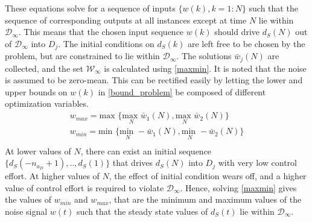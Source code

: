 \documentclass[letterpaper, 10 pt, conference]{ieeeconf}  %
\begin{document}
\begin{enumerate}
	These equations solve for a sequence of inputs $\{w(k), k={1:N}\}$ such that the sequence of corresponding outputs at all instances except at time $N$ lie within $\mathcal{D}_{\infty}$. This means that the chosen input sequence $w(k)$ should drive $d_S(N)$ out of $\mathcal{D}_{\infty}$ into $D_j$. The initial conditions on $d_S(k)$ are left free to be chosen by the problem, but are constrained to lie within $\mathcal{D}_{\infty}$.
	The solutions $\bar{w}_j(N)$ are collected, and the set $\mathcal{W}_{\infty}$ is calculated using \eqref{maxmin}. It is noted that the noise is assumed to be zero-mean. This can be rectified easily by letting the lower and upper bounds on $w(k)$ in \eqref{bound_problem} be composed of different optimization variables.
	\begin{equation}
		\begin{matrix}
		w_{max} = {\text{max }}\{\underset{N}{\text{max }} \bar{w}_1(N),\underset{N}{\text{max }}\bar{w}_2(N)\} \\
		w_{min} = {\text{min }}\{\underset{N}{\text{min }}-\bar{w}_1(N),\underset{N}{\text{min }}-\bar{w}_2(N)\} \\
		\end{matrix}
		\label{maxmin}
	\end{equation}
	At lower values of $N$, there can exist an initial sequence $\{d_S(-n_{a_D}+1),..,d_S(1)\}$ that drives $d_S(N)$ into $D_j$ with very low control effort. At higher values of $N$, the effect of initial condition wears off, and a higher value of control effort is required to violate $\mathcal{D}_{\infty}$. Hence, solving \eqref{maxmin} gives the values of $w_{min}$ and $w_{max}$, that are the minimum and maximum values of the noise signal $w(t)$ such that the steady state values of $d_S(t)$ lie within $\mathcal{D}_{\infty}$.  

\end{enumerate}
\end{document}
